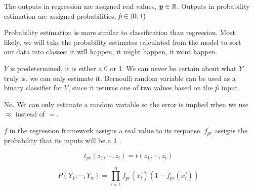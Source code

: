 \documentclass[12pt]{article}
\begin{document}


\begin{enumerate}


The outputs in regression are assigned real values, $\boldsymbol{y}\in\mathbb{R}$. Outputs in probability estimation are assigned probabilities, $\hat{p}\in(0,1)$


Probability estimation is more similar to classification than regression. Most likely, we will take the probability estimates calculated from the model to sort our data into classes: it will happen, it might happen, it wont happen.


$Y$ is predetermined, it is either a 0 or 1. We can never be certain about what $Y$ truly is, we can only estimate it. Bernoulli random variable can be used as a binary classifier for $Y$, since it returns one of two values based on the $\hat{p}$ input.


No. We can only estimate a random variable so the error is implied when we use $\approx$ instead of $=$.


$f$ in the regression framework assigns a real value to its response. $f_{pr}$ assigns the probability that its inputs will be a 1 .


\begin{equation*}
t_{pr}(z_1,\cdots,z_t)=t(z_1,\cdots,z_t)
\end{equation*}

\begin{equation*}
P(Y_1, \cdots, Y_n)=\prod_{i=1}^nf_{pr}(\vec{x_i})(1-f_{pr}(\vec{x_i}))
\end{equation*}


\end{enumerate}
\end{document}
